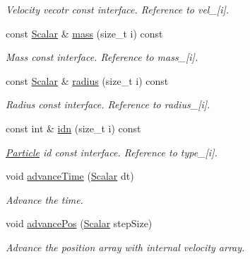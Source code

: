 \begin{DoxyCompactItemize}
\begin{DoxyCompactList}\small\item\em Velocity vecotr const interface. Reference to vel\+\_\+\mbox{[}i\mbox{]}. \end{DoxyCompactList}\item 
const \mbox{\hyperlink{class_space_h_1_1_vel_indep_particles_aeb47d8131b30ed790320ff634f0d6af1}{Scalar}} \& \mbox{\hyperlink{class_space_h_1_1_vel_indep_particles_a5e35094133e5409570e83d00c922df6a}{mass}} (size\+\_\+t i) const
\begin{DoxyCompactList}\small\item\em Mass const interface. Reference to mass\+\_\+\mbox{[}i\mbox{]}. \end{DoxyCompactList}\item 
const \mbox{\hyperlink{class_space_h_1_1_vel_indep_particles_aeb47d8131b30ed790320ff634f0d6af1}{Scalar}} \& \mbox{\hyperlink{class_space_h_1_1_vel_indep_particles_a2abdb6fe4461cf064d8c0e66df1de13d}{radius}} (size\+\_\+t i) const
\begin{DoxyCompactList}\small\item\em Radius const interface. Reference to radius\+\_\+\mbox{[}i\mbox{]}. \end{DoxyCompactList}\item 
const int \& \mbox{\hyperlink{class_space_h_1_1_vel_indep_particles_a7753d4a30f9f62fe1acd51fbcdaf78c7}{idn}} (size\+\_\+t i) const
\begin{DoxyCompactList}\small\item\em \mbox{\hyperlink{struct_space_h_1_1_particle}{Particle}} id const interface. Reference to type\+\_\+\mbox{[}i\mbox{]}. \end{DoxyCompactList}\item 
void \mbox{\hyperlink{class_space_h_1_1_vel_indep_particles_a3d72551854f8623412f0877e7847b4a9}{advance\+Time}} (\mbox{\hyperlink{class_space_h_1_1_vel_indep_particles_aeb47d8131b30ed790320ff634f0d6af1}{Scalar}} dt)
\begin{DoxyCompactList}\small\item\em Advance the time. \end{DoxyCompactList}\item 
void \mbox{\hyperlink{class_space_h_1_1_vel_indep_particles_a19941153b3529267f5bfa6e7b6e2d4ff}{advance\+Pos}} (\mbox{\hyperlink{class_space_h_1_1_vel_indep_particles_aeb47d8131b30ed790320ff634f0d6af1}{Scalar}} step\+Size)
\begin{DoxyCompactList}\small\item\em Advance the position array with internal velocity array. \end{DoxyCompactList}\item 

\end{DoxyCompactItemize}
